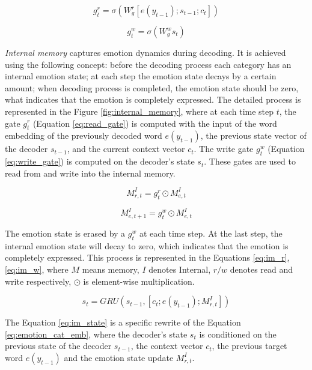 \begin{equation} \label{eq:read_gate}
g_t^r = \sigma(W_g^r[e(y_{t-1}); s_{t-1}; c_t])
\end{equation}

\begin{equation} \label{eq:write_gate}
g_t^w = \sigma(W_g^w s_t)
\end{equation}

\textit{Internal memory} captures emotion dynamics during decoding. It is achieved using the following concept: before the decoding process each category has an internal emotion state; at each step the emotion state decays by a certain amount; when decoding process is completed, the emotion state should be zero, what indicates that the emotion is completely expressed. The detailed process is represented in the Figure \ref{fig:internal_memory}, where at each time step $t$, the gate $g_t^r$ (Equation \ref{eq:read_gate}) is computed with the input of the word embedding of the previously decoded word $e(y_{t-1})$, the previous state vector of the decoder $s_{t-1}$, and the current context vector $c_t$. The write gate $g_t^w$ (Equation \ref{eq:write_gate}) is computed on the decoder's state $s_t$. These gates are used to read from and write into the internal memory.

\begin{equation} \label{eq:im_r}
M_{r,t}^I = g_t^r \odot M_{e,t}^I
\end{equation}

\begin{equation} \label{eq:im_w}
M_{e,t+1}^I = g_t^w \odot M_{e,t}^I
\end{equation}

The emotion state is erased by a $g_t^w$ at each time step. At the last step, the internal emotion state will decay to zero, which indicates that the emotion is completely expressed. This process is represented in the Equations \ref{eq:im_r}, \ref{eq:im_w}, where $M$ means memory, $I$ denotes Internal, $r/w$ denotes read and write respectively, $\odot$ is element-wise multiplication.

\begin{equation} \label{eq:im_state}
s_t = GRU(s_{t-1},[c_t; e(y_{t-1}); M_{r,t}^I])
\end{equation}

The Equation \ref{eq:im_state} is a specific rewrite of the Equation \ref{eq:emotion_cat_emb}, where the decoder's state $s_t$ is conditioned on the previous state of the decoder $s_{t-1}$, the context vector $c_t$, the previous target word $e(y_{t-1})$ and the emotion state update $M_{r,t}^I$.

